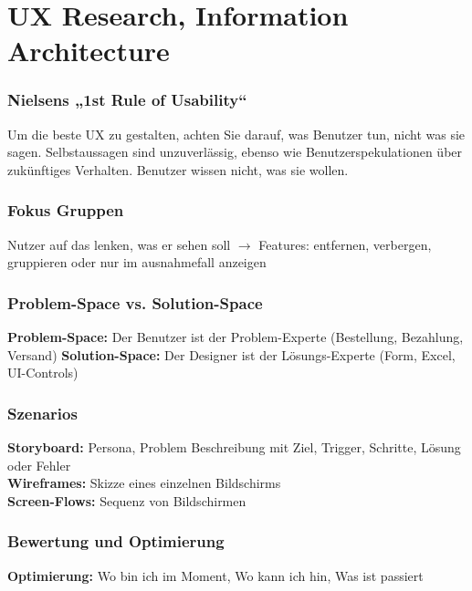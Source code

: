 
\section{UX Research, Information Architecture}


\subsubsection{Nielsens „1st Rule of Usability“}
Um die beste UX zu gestalten, achten Sie darauf, was Benutzer tun, nicht was sie sagen. Selbstaussagen sind unzuverlässig, ebenso wie Benutzerspekulationen über zukünftiges Verhalten. Benutzer wissen nicht, was sie wollen.

\subsubsection{Fokus Gruppen}
Nutzer auf das lenken, was er sehen soll $\rightarrow$ Features: entfernen, verbergen, gruppieren oder nur im ausnahmefall anzeigen


\subsubsection{Problem-Space vs. Solution-Space}
\textbf{Problem-Space:} Der Benutzer ist der Problem-Experte (Bestellung, Bezahlung, Versand)
\textbf{Solution-Space:} Der Designer ist der Lösungs-Experte (Form, Excel, UI-Controls)


\subsubsection{Szenarios}
\textbf{Storyboard:} Persona, Problem Beschreibung mit Ziel, Trigger, Schritte, Lösung oder Fehler\\
\textbf{Wireframes:} Skizze eines einzelnen Bildschirms\\
\textbf{Screen-Flows:} Sequenz von Bildschirmen


\subsubsection{Bewertung und Optimierung}
\textbf{Optimierung:} Wo bin ich im Moment, Wo kann ich hin, Was ist passiert

